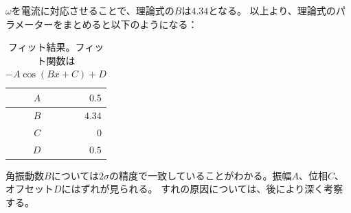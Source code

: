 $\omega$を電流に対応させることで、理論式の$B$は$4.34$となる。
以上より、理論式のパラメーターをまとめると以下のようになる：
\begin{table}[H]
\centering
\begin{tabular}{|r|r|}
\hline
$A$&$0.5$\\
\hline
$B$&$4.34$\\
\hline
$C$&$0$\\
\hline
$D$&$0.5$\\
\hline
\end{tabular}
\caption{フィット結果。フィット関数は$-A\cos(Bx+C)+D$}
\end{table}

角振動数$B$については$2\sigma$の精度で一致していることがわかる。振幅$A$、位相$C$、オフセット$D$にはずれが見られる。
すれの原因については、後により深く考察する。

\endgroup